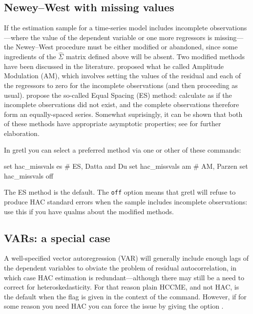 \subsection{Newey--West with missing values}
\label{sec:has-missvals}

If the estimation sample for a time-series model includes incomplete
observations---where the value of the dependent variable or one more
regressors is missing---the Newey--West procedure must be either
modified or abandoned, since some ingredients of the $\hat{\Sigma}$
matrix defined above will be absent. Two modified methods have been
discussed in the literature. \cite{parzen63} proposed what he called
Amplitude Modulation (AM), which involves setting the values of the
residual and each of the regressors to zero for the incomplete
observations (and then proceeding as usual). \cite{datta-du12} propose
the so-called Equal Spacing (ES) method: calculate as if the incomplete
observations did not exist, and the complete observations therefore
form an equally-spaced series. Somewhat suprisingly, it can be shown
that both of these methods have appropriate asymptotic properties;
see \cite{rho-vogelsang18} for further elaboration.

In gretl you can select a preferred method via one or other of these
commands:
\begin{code}
set hac_missvals es # ES, Datta and Du
set hac_missvals am # AM, Parzen
set hac_missvals off
\end{code}

The ES method is the default. The \texttt{off} option means that gretl
will refuse to produce HAC standard errors when the sample includes
incomplete observations: use this if you have qualms about the
modified methods.

\subsection{VARs: a special case}
\label{sec:hac-VARs}

A well-specified vector autoregression (VAR) will generally include
enough lags of the dependent variables to obviate the problem of
residual autocorrelation, in which case HAC estimation is
redundant---although there may still be a need to correct for
heteroskedasticity. For that reason plain HCCME, and not HAC, is the
default when the  flag is given in the context of the
 command. However, if for some reason you need HAC you can
force the issue by giving the option .

